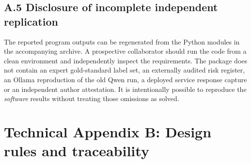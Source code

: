 \documentclass[11pt,twocolumn]{article}
\begin{document}
\subsection*{A.5 Disclosure of incomplete independent replication}
The reported program outputs can be regenerated from the Python modules in the accompanying archive. A prospective collaborator should run the code from a clean environment and independently inspect the requirements. The package does not contain an expert gold-standard label set, an externally audited risk register, an Ollama reproduction of the old Qwen run, a deployed service response capture or an independent author attestation. It is intentionally possible to reproduce the \emph{software} results without treating those omissions as solved.

\section*{Technical Appendix B: Design rules and traceability}\label{app:b}
\end{document}
